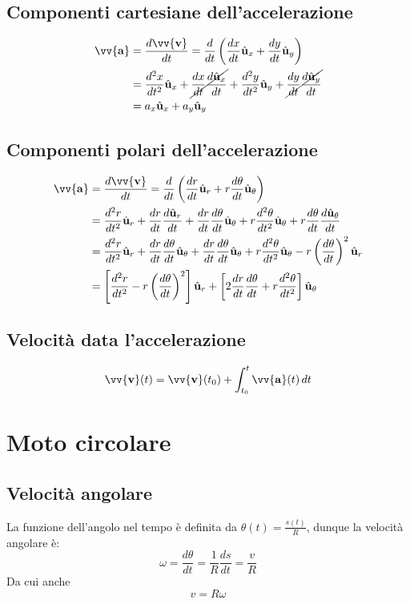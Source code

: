 \documentclass{report}
\newcommand{\versore}[1]{\hat{\mathbf{u}}_{#1}}
\newcommand{\ux}{\versore{x}}
\newcommand{\uy}{\versore{y}}
\newcommand{\ur}{\versore{r}}
\newcommand{\uth}{\versore{\theta}}
\newcommand{\vett}[1]{\vv{\mathbf{#1}}}
\begin{document}
\subsection{Componenti cartesiane dell'accelerazione}
\begin{align*}
    \vett{a} & = \frac{d\vett{v}}{dt} 
    = \frac{d}{dt}\left(\frac{dx}{dt}\ux + \frac{dy}{dt}\uy\right) \\
    & = \frac{d^2 x}{dt^2}\ux + \cancel{\frac{dx}{dt}\frac{d\ux}{dt}}
    + \frac{d^2 y}{dt^2}\uy + \cancel{\frac{dy}{dt}\frac{d\uy}{dt}} \\
    & = a_x\ux + a_y\uy
\end{align*}

\subsection{Componenti polari dell'accelerazione}
\begin{align}
    \vett{a} & = \frac{d\vett{v}}{dt} 
    = \frac{d}{dt}\left(\frac{dr}{dt}\ur + r\frac{d\theta}{dt}\uth\right) \nonumber \\
    & = \frac{d^2 r}{dt^2}\ur + \frac{dr}{dt}\frac{d\ur}{dt} 
    + \frac{dr}{dt}\frac{d\theta}{dt}\uth + r\frac{d^2 \theta}{dt^2}\uth
    + r\frac{d\theta}{dt}\frac{d\uth}{dt} \nonumber \\
    & = \frac{d^2 r}{dt^2}\ur + \frac{dr}{dt}\frac{d\theta}{dt}\uth 
    + \frac{dr}{dt}\frac{d\theta}{dt}\uth + r\frac{d^2 \theta}{dt^2}\uth
    - r\left(\frac{d\theta}{dt}\right)^2\ur \nonumber \\
    & = \left[\frac{d^2 r}{dt^2} - r\left(\frac{d\theta}{dt}\right)^2\right]\ur
    + \left[2\frac{dr}{dt}\frac{d\theta}{dt} + r\frac{d^2 \theta}{dt^2}\right]\uth
\end{align}

\subsection{Velocità data l'accelerazione}
\begin{equation}
    \vett{v}(t) = \vett{v}(t_0) + \int_{t_0}^{t}\vett{a}(t)\,dt
\end{equation}

\section{Moto circolare}
\subsection{Velocità angolare}
La funzione dell'angolo nel tempo è definita da \(\theta(t) = \frac{s(t)}{R}\), dunque la velocità angolare è:
\begin{equation}
    \omega = \frac{d\theta}{dt} = \frac{1}{R}\frac{ds}{dt} = \frac{v}{R}
\end{equation}
Da cui anche
\begin{equation*}
    v = R\omega
\end{equation*}
\end{document}

